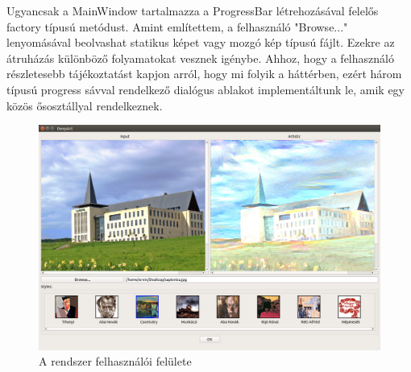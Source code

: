 \documentclass[12pt, a4paper, oneside]{book}
\theoremstyle{tetel}
\begin{document}
\newline
\indent
Ugyancsak a MainWindow tartalmazza a ProgressBar létrehozásával felelős factory típusú metódust. Amint említettem, a felhasználó "Browse..." lenyomásával beolvashat statikus képet vagy mozgó kép típusú fájlt. Ezekre az átruházás különböző folyamatokat vesznek igénybe. Ahhoz, hogy a felhasználó részletesebb tájékoztatást kapjon arról, hogy mi folyik a háttérben, ezért három típusú progress sávval rendelkező dialógus ablakot implementáltunk le, amik egy közös ősosztállyal rendelkeznek.

\begin{figure}[!htbp]
	\begin{center}
		\includegraphics[scale=0.35]{main_ui.png}
		\caption{A rendszer felhasználói felülete}
		\label{graphical_ui)}
	\end{center}
\end{figure}
\end{document}

